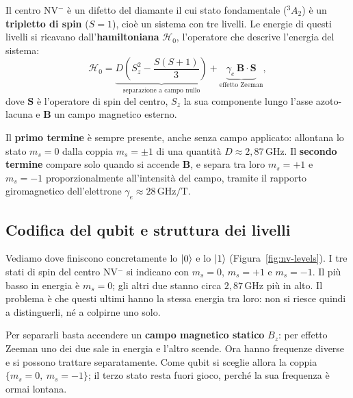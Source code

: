 \begin{definizione}[Centro NV$^-$]
  Il centro NV$^-$ è un difetto del diamante il cui stato fondamentale
  ($^3A_2$) è un \textbf{tripletto di spin} ($S = 1$), cioè un sistema con tre
  livelli. Le energie di questi livelli si ricavano dall'\textbf{hamiltoniana}
  $\mathcal{H}_0$, l'operatore che descrive l'energia del sistema:
  \begin{equation}
    \mathcal{H}_0 =
      \underbrace{D\left(S_z^2 - \frac{S(S+1)}{3}\right)}_{\text{separazione a campo nullo}}
      + \underbrace{\gamma_e\, \mathbf{B} \cdot \mathbf{S}}_{\text{effetto Zeeman}},
    \label{eq:ham-nv}
  \end{equation}
  dove $\mathbf{S}$ è l'operatore di spin del centro, $S_z$ la sua componente
  lungo l'asse azoto-lacuna e $\mathbf{B}$ un campo magnetico esterno.

  Il \textbf{primo termine} è sempre presente, anche senza campo applicato:
  allontana lo stato $m_s = 0$ dalla coppia $m_s = \pm 1$ di una quantità
  $D \approx 2{,}87\,\text{GHz}$. Il \textbf{secondo termine} compare solo
  quando si accende $\mathbf{B}$, e separa tra loro $m_s = +1$ e $m_s = -1$
  proporzionalmente all'intensità del campo, tramite il rapporto giromagnetico
  dell'elettrone $\gamma_e \approx 28\,\text{GHz/T}$.
\end{definizione}

\subsection{Codifica del qubit e struttura dei livelli}
\label{subsec:nv-qubit}

Vediamo dove finiscono concretamente lo $\ket{0}$ e lo $\ket{1}$
(Figura~\ref{fig:nv-levels}). I tre stati di spin del centro NV$^-$ si indicano
con $m_s = 0$, $m_s = +1$ e $m_s = -1$. Il più basso in energia è $m_s = 0$; gli
altri due stanno circa $2{,}87\,\text{GHz}$ più in alto. Il problema è che questi
ultimi hanno la stessa energia tra loro: non si riesce quindi a distinguerli, né
a colpirne uno solo.

Per separarli basta accendere un \textbf{campo magnetico statico} $B_z$: per
effetto Zeeman uno dei due sale in energia e l'altro scende. Ora hanno frequenze
diverse e si possono trattare separatamente. Come qubit si sceglie allora la
coppia $\{m_s = 0,\ m_s = -1\}$; il terzo stato resta fuori gioco, perché la sua
frequenza è ormai lontana.

